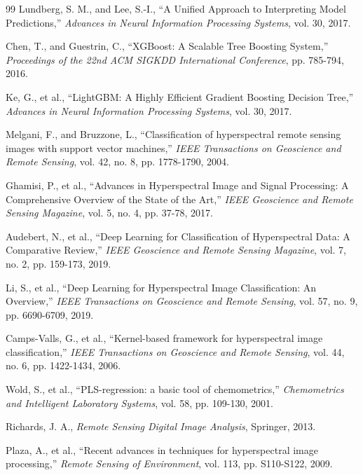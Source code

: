 \documentclass[pdflatex,sn-mathphys-num,iicol]{sn-jnl}
\begin{document}
\begin{thebibliography}{99}
Lundberg, S. M., and Lee, S.-I., ``A Unified Approach to Interpreting Model Predictions,'' \textit{Advances in Neural Information Processing Systems}, vol. 30, 2017.

Chen, T., and Guestrin, C., ``XGBoost: A Scalable Tree Boosting System,'' \textit{Proceedings of the 22nd ACM SIGKDD International Conference}, pp. 785-794, 2016.

Ke, G., et al., ``LightGBM: A Highly Efficient Gradient Boosting Decision Tree,'' \textit{Advances in Neural Information Processing Systems}, vol. 30, 2017.

Melgani, F., and Bruzzone, L., ``Classification of hyperspectral remote sensing images with support vector machines,'' \textit{IEEE Transactions on Geoscience and Remote Sensing}, vol. 42, no. 8, pp. 1778-1790, 2004.

Ghamisi, P., et al., ``Advances in Hyperspectral Image and Signal Processing: A Comprehensive Overview of the State of the Art,'' \textit{IEEE Geoscience and Remote Sensing Magazine}, vol. 5, no. 4, pp. 37-78, 2017.

Audebert, N., et al., ``Deep Learning for Classification of Hyperspectral Data: A Comparative Review,'' \textit{IEEE Geoscience and Remote Sensing Magazine}, vol. 7, no. 2, pp. 159-173, 2019.

Li, S., et al., ``Deep Learning for Hyperspectral Image Classification: An Overview,'' \textit{IEEE Transactions on Geoscience and Remote Sensing}, vol. 57, no. 9, pp. 6690-6709, 2019.

Camps-Valls, G., et al., ``Kernel-based framework for hyperspectral image classification,'' \textit{IEEE Transactions on Geoscience and Remote Sensing}, vol. 44, no. 6, pp. 1422-1434, 2006.

Wold, S., et al., ``PLS-regression: a basic tool of chemometrics,'' \textit{Chemometrics and Intelligent Laboratory Systems}, vol. 58, pp. 109-130, 2001.

Richards, J. A., \textit{Remote Sensing Digital Image Analysis}, Springer, 2013.

Plaza, A., et al., ``Recent advances in techniques for hyperspectral image processing,'' \textit{Remote Sensing of Environment}, vol. 113, pp. S110-S122, 2009.

\end{thebibliography}
\end{document}

